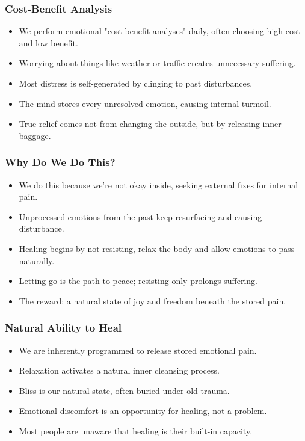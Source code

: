 \begin{frame}[fragile]\frametitle{Cost-Benefit Analysis}
    \begin{itemize}
        \item We perform emotional "cost-benefit analyses" daily, often choosing high cost and low benefit.
        \item Worrying about things like weather or traffic creates unnecessary suffering.
        \item Most distress is self-generated by clinging to past disturbances.
        \item The mind stores every unresolved emotion, causing internal turmoil.
        \item True relief comes not from changing the outside, but by releasing inner baggage.
    \end{itemize}
\end{frame}

\begin{frame}[fragile]\frametitle{Why Do We Do This?}
    \begin{itemize}
        \item We do this because we’re not okay inside, seeking external fixes for internal pain.
        \item Unprocessed emotions from the past keep resurfacing and causing disturbance.
        \item Healing begins by not resisting, relax the body and allow emotions to pass naturally.
        \item Letting go is the path to peace; resisting only prolongs suffering.
        \item The reward: a natural state of joy and freedom beneath the stored pain.
    \end{itemize}
\end{frame}

\begin{frame}[fragile]\frametitle{Natural Ability to Heal}
    \begin{itemize}
        \item We are inherently programmed to release stored emotional pain.
        \item Relaxation activates a natural inner cleansing process.
        \item Bliss is our natural state, often buried under old trauma.
        \item Emotional discomfort is an opportunity for healing, not a problem.
        \item Most people are unaware that healing is their built-in capacity.
    \end{itemize}
\end{frame}

